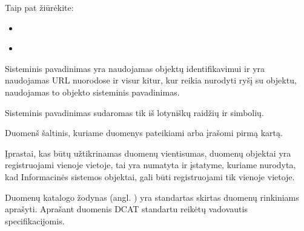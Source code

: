 \documentclass[letterpaper,10pt,lithuanian]{sphinxmanual}
\begin{document}
\begin{description}
\begin{sphinxseealso}{Taip pat žiūrėkite:}
\begin{itemize}
\item {} 
\sphinxAtStartPar
{\hyperref[\detokenize{tipai:type.backref}]{}}

\item {} 
\sphinxAtStartPar
{\hyperref[\detokenize{tipai:type.object}]{}}

\end{itemize}


\end{sphinxseealso}


\sphinxAtStartPar
Sisteminis pavadinimas yra naudojamas objektų identifikavimui ir yra
naudojamas URL nuorodose ir visur kitur, kur reikia nurodyti ryšį su
objektu, naudojamas to objekto sisteminis pavadinimas.

\sphinxAtStartPar
Sisteminis pavadinimas sudaromas tik iš lotyniškų raidžių ir \sphinxtitleref{\sphinxhyphen{}\_/}
simbolių.

\sphinxAtStartPar
Duomenš šaltinis, kuriame duomenys pateikiami arba įrašomi pirmą kartą.

\sphinxAtStartPar
Įprastai, kas būtų užtikrinamas duomenų vientisumas, duomenų objektai
yra registruojami vienoje vietoje, tai yra numatyta ir {\hyperref[\detokenize{savokos:term-VIIVI}]{}}
įstatyme, kuriame nurodyta, kad Informacinės sistemos objektai, gali
būti registruojami tik vienoje vietoje.

\sphinxAtStartPar
Duomenų katalogo žodynas (angl. )  yra
standartas skirtas duomenų rinkiniams aprašyti. Aprašant duomenis DCAT
standartu reikėtų vadovautis {\hyperref[\detokenize{savokos:term-DCAT-AP}]{}} specifikacijomis.


\end{description}
\end{document}
